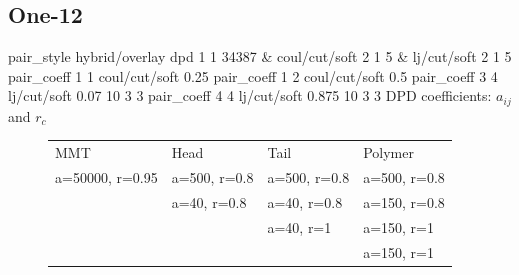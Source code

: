 \documentclass[a4paper]{article}
\begin{document}
\subsection*{One-12}
pair\_style hybrid/overlay dpd 1 1 34387 \& coul/cut/soft 2 1 5 \& 
lj/cut/soft 2 1 5\newline
pair\_coeff 1 1 coul/cut/soft 0.25
pair\_coeff 1 2 coul/cut/soft 0.5\newline
pair\_coeff 3 4 lj/cut/soft 0.07    10 3 3\newline
pair\_coeff 4 4 lj/cut/soft 0.875    10 3 3\newline
DPD coefficients: $a_{ij}$ and $r_c$
\begin{figure}[H]\begin{tabular}{llll}
MMT             & Head         & Tail         & Polymer      \\
a=50000, r=0.95 & a=500, r=0.8 & a=500, r=0.8 & a=500, r=0.8 \\
                & a=40,  r=0.8 & a=40,  r=0.8 & a=150, r=0.8 \\
                &              & a=40,  r=1   & a=150, r=1   \\
                &              &              & a=150, r=1   \\
\end{tabular}\end{figure}
\end{document}
